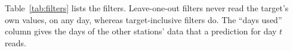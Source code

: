 \documentclass[preprint,12pt,authoryear]{elsarticle}
\begin{document}
Table~\ref{tab:filters} lists the filters. Leave-one-out filters never read the target's own values, on any day, whereas target-inclusive filters do. The ``days used'' column gives the days of the other stations' data that a prediction for day $t$ reads.
\end{document}
